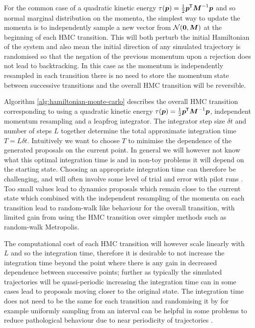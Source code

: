 For the common case of a quadratic kinetic energy $\tau(\boldsymbol{p}) = \frac{1}{2}\boldsymbol{p}^{\mkern-1.5mu\mathsf{T}}\boldsymbol{M}^{-1}\boldsymbol{p}$ and so normal marginal distribution on the momenta, the simplest way to update the momenta is to independently sample a new vector from $\nrm{\vct{0},\mtx{M}}$ at the beginning of each \ac{HMC} transition. This will both perturb the initial Hamiltonian of the system and also mean the initial direction of any simulated trajectory is randomised so that the negation of the previous momentum upon a rejection does not lead to backtracking. In this case as the momentum is independently resampled in each transition there is no need to store the momentum state between successive transitions and the overall \ac{HMC} transition will be reversible.  

Algorithm \ref{alg:hamiltonian-monte-carlo} describes the overall \ac{HMC} transition corresponding to using a quadratic kinetic energy $\tau(\boldsymbol{p}) = \frac{1}{2}\boldsymbol{p}^{\mkern-1.5mu\mathsf{T}}\boldsymbol{M}^{-1}\boldsymbol{p}$, independent momentum resampling and a leapfrog integrator. The integrator step size $\delta t$ and number of steps $L$ together determine the total approximate integration time $T = L \delta t$. Intuitively we want to choose $T$ to minimise the dependence of the generated proposals on the current point. In general we will however not know what this optimal integration time is and in non-toy problems it will depend on the starting state. Choosing an appropriate integration time can therefore be challenging, and will often involve some level of trial and error with pilot runs \citep{neal2011mcmc}. Too small values lead to dynamics proposals which remain close to the current state which combined with the independent resampling of the momenta on each transition lead to random-walk like behaviour for the overall transition, with limited gain from using the \ac{HMC} transition over simpler methods such as random-walk Metropolis. 

The computational cost of each \ac{HMC} transition will however scale linearly with $L$ and so the integration time, therefore it is desirable to not increase the integration time beyond the point where there is any gain in decreased dependence between successive points; further as typically the simulated trajectories will be quasi-periodic increasing the integration time can in some cases lead to proposals moving closer to the original state. The integration time does not need to be the same for each transition and randomising it by for example uniformly sampling from an interval can be helpful in some problems to reduce pathological behaviour due to near periodicity of trajectories \citep{neal2011mcmc}.

